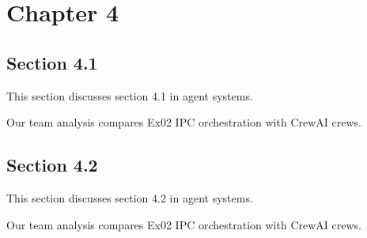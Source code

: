 \section{Chapter 4}

\subsection{Section 4.1}
This section discusses section 4.1 in agent systems. \cite{crewai2024}

Our team analysis compares Ex02 IPC orchestration with CrewAI crews. \cite{crewai2024}

\subsection{Section 4.2}
This section discusses section 4.2 in agent systems. \cite{crewai2024}

Our team analysis compares Ex02 IPC orchestration with CrewAI crews. \cite{crewai2024}
